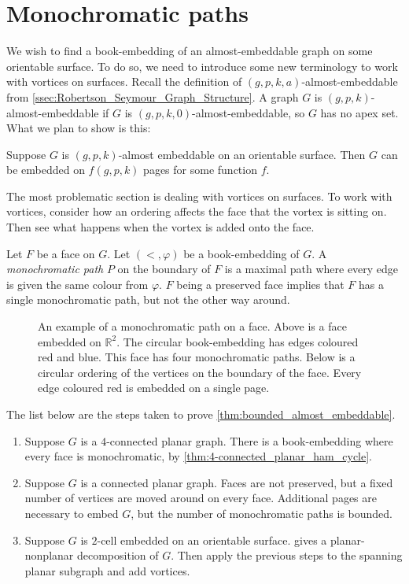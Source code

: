 \section{Monochromatic paths}

We wish to find a book-embedding of an almost-embeddable graph on some orientable surface. To do so, we need to introduce some new terminology to work with vortices on surfaces. 
Recall the definition of $(g, p, k, a)$-almost-embeddable from \cref{ssec:Robertson_Seymour_Graph_Structure}. A graph $G$ is $(g, p, k)$-almost-embeddable if $G$ is $(g, p, k, 0)$-almost-embeddable, so $G$ has no apex set.
What we plan to show is this:
\begin{theorem}\label{thm:bounded_almost_embeddable}
	Suppose $G$ is $(g, p, k)$-almost embeddable on an orientable surface. Then $G$ can be embedded on \(f(g, p, k)\) pages for some function $f$.
\end{theorem}

The most problematic section is dealing with vortices on surfaces.
To work with vortices, consider how an ordering affects the face that the vortex is sitting on. Then see what happens when the vortex is added onto the face. 

Let \(F\) be a face on \(G\). Let \( (<, \varphi) \) be a book-embedding of \(G\). A \textit{monochromatic path} $P$ on the boundary of $F$ is a maximal path where every edge is given the same colour from $\varphi$. $F$ being a preserved face implies that $F$ has a single monochromatic path, but not the other way around. 

\begin{figure}[h!]
	\centering
	
	\caption[Monochromatic paths]{An example of a monochromatic path on a face. Above is a face embedded on $\mathbb{R}^2$. The circular book-embedding has edges coloured red and blue. This face has four monochromatic paths. Below is a circular ordering of the vertices on the boundary of the face. Every edge coloured red is embedded on a single page.}
\end{figure}


The list below are the steps taken to prove \cref{thm:bounded_almost_embeddable}.
\begin{enumerate}
	\item Suppose $G$ is a \(4\)-connected planar graph. There is a book-embedding where every face is monochromatic, by \cref{thm:4-connected_planar_ham_cycle}. 
	\item Suppose \(G\) is a connected planar graph. Faces are not preserved, but a fixed number of vertices are moved around on every face. Additional pages are necessary to embed $G$, but the number of monochromatic paths is bounded. 
	\item Suppose \(G\) is $2$-cell embedded on an orientable surface. \textcite{heathPagenumberGenusGraphs1992} gives a planar-nonplanar decomposition of $G$. Then apply the previous steps to the spanning planar subgraph and add vortices.
\end{enumerate}

